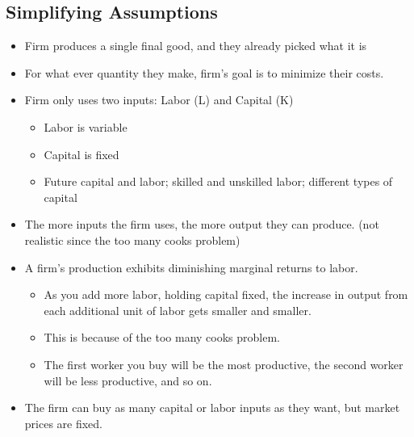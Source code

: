 \documentclass{article}
\begin{document}
\subsection{Simplifying Assumptions}
\begin{itemize}
  \item Firm produces a single final good, and they already picked what it is
  \item For what ever quantity they make, firm's goal is to minimize their costs.
  \item Firm only uses two inputs: Labor (L) and Capital (K)
    \begin{itemize}
      \item Labor is variable
      \item Capital is fixed
      \item Future capital and labor; skilled and unskilled labor; different types of capital
    \end{itemize}
  \item The more inputs the firm uses, the more output they can produce.
    (not realistic since the too many cooks problem)
  \item A firm's production exhibits diminishing marginal returns to labor.
    \begin{itemize}
      \item As you add more labor, holding capital fixed, the increase in output
        from each additional unit of labor gets smaller and smaller.
      \item This is because of the too many cooks problem.
      \item The first worker you buy will be the most productive, the second
        worker will be less productive, and so on.
    \end{itemize}
  \item The firm can buy as many capital or labor inputs as they want, but market prices are fixed.
\end{itemize}
\end{document}
